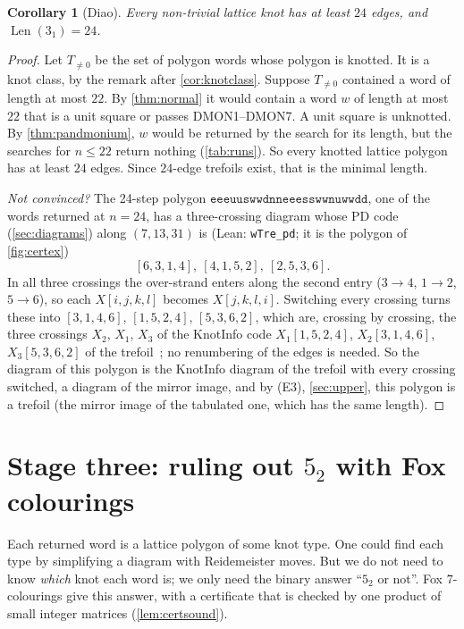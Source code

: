 \documentclass[11pt]{article}
\theoremstyle{plain}
\newtheorem{corollary}[theorem]{Corollary}
\theoremstyle{definition}
\theoremstyle{remark}
\newenvironment{notconvinced}{\par\emph{Not convinced?} }{\par}
\newcommand{\Len}{\operatorname{Len}}
\newcommand{\word}[1]{\texttt{#1}}
\newcommand{\lean}[1]{\texttt{#1}}
\newcommand{\dmon}[1]{\textup{DMON#1}}
\begin{document}
\begin{corollary}[Diao]\label{cor:trefoil}
Every non-trivial lattice knot has at least $24$ edges, and $\Len(3_1)=24$.
\end{corollary}
\begin{proof}
Let $T_{\ne0}$ be the set of polygon words whose polygon is knotted. It is a knot class, by the remark after
\cref{cor:knotclass}. Suppose $T_{\ne0}$ contained a word of length at most
$22$. By \cref{thm:normal} it would contain a word $w$ of length at most $22$ that is a unit square or
passes \dmon1--\dmon7. A unit square is unknotted. By \cref{thm:pandmonium}, $w$ would be returned by
the search for its length, but the searches for $n\le22$ return nothing (\cref{tab:runs}). So every
knotted lattice polygon has at least $24$ edges. Since $24$-edge trefoils exist, that is the minimal length.
\begin{notconvinced}
The 24-step polygon
$\word{eeeuuswwdnneeesswwnuwwdd}$, one of the words returned at $n=24$, has a three-crossing diagram
whose PD code (\cref{sec:diagrams}) along $(7,13,31)$ is (Lean: \lean{wTre\_pd}; it is the polygon of
\cref{fig:certex})
\[ [6,3,1,4],\ [4,1,5,2],\ [2,5,3,6]. \]
In all three crossings the over-strand enters along the second entry ($3\to4$, $1\to2$, $5\to6$), so
each $X[i,j,k,l]$ becomes $X[j,k,l,i]$. Switching every crossing turns these into $[3,1,4,6]$,
$[1,5,2,4]$, $[5,3,6,2]$, which are, crossing by
crossing, the three crossings $X_2$, $X_1$, $X_3$ of the KnotInfo code $X_1[1,5,2,4]$, $X_2[3,1,4,6]$,
$X_3[5,3,6,2]$ of the trefoil~\cite{KnotInfo}; no renumbering of the edges is needed. So the diagram of
this polygon is the KnotInfo diagram of the trefoil with every crossing switched, a diagram of the
mirror image, and by (E3), \cref{sec:upper}, this polygon is a trefoil (the mirror image of the
tabulated one, which has the same length).
\end{notconvinced}
\end{proof}

\section{Stage three: ruling out $5_2$ with Fox colourings}\label{sec:colour}

Each returned word is a lattice polygon of some knot type. One could find each type by simplifying a
diagram with Reidemeister moves. But we do not need to know \emph{which} knot each word is; we only
need the binary answer ``$5_2$ or not''. Fox $7$-colourings give this answer, with a certificate that
is checked by one product of small integer matrices (\cref{lem:certsound}).
\end{document}
